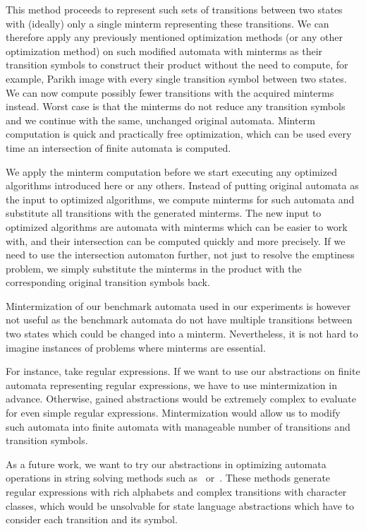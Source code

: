 This method proceeds to represent such sets of transitions between two states with (ideally) only a single minterm representing these transitions. We can therefore apply any previously mentioned optimization methods (or any other optimization method) on such modified automata with minterms as their transition symbols to construct their product without the need to compute, for example, Parikh image with every single transition symbol between two states. We can now compute possibly fewer transitions with the acquired minterms instead. Worst case is that the minterms do not reduce any transition symbols and we continue with the same, unchanged original automata. Minterm computation is quick and practically free optimization, which can be used every time an intersection of finite automata is computed.

We apply the minterm computation before we start executing any optimized algorithms introduced here or any others. Instead of putting original automata as the input to optimized algorithms, we compute minterms for such automata and substitute all transitions with the generated minterms. The new input to optimized algorithms are automata with minterms which can be easier to work with, and their intersection can be computed quickly and more precisely. If we need to use the intersection automaton further, not just to resolve the emptiness problem, we simply substitute the minterms in the product with the corresponding original transition symbols back.

Mintermization of our benchmark automata used in our experiments is however not useful as the benchmark automata do not have multiple transitions between two states which could be changed into a minterm. Nevertheless, it is not hard to imagine instances of problems where minterms are essential.

For instance, take regular expressions. If we want to use our abstractions on finite automata representing regular expressions, we have to use mintermization in advance. Otherwise, gained abstractions would be extremely complex to evaluate for even simple regular expressions. Mintermization would allow us to modify such automata into finite automata with manageable number of transitions and transition symbols.

As a future work, we want to try our abstractions in optimizing automata operations in string solving methods such as~\cite{10.1007/978-3-319-08867-9_10} or~\cite{DBLP:conf/popl/LinB16}. These methods generate regular expressions with rich alphabets and complex transitions with character classes, which would be unsolvable for state language abstractions which have to consider each transition and its symbol.

